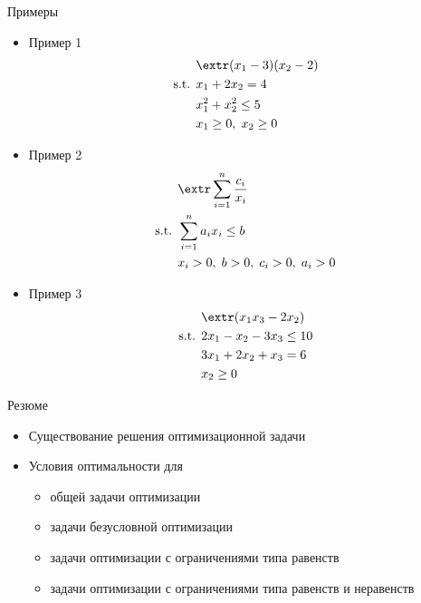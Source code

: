 \documentclass[12pt]{beamer}
\begin{document}
\begin{frame}{Примеры}
\begin{itemize}
\small
\item Пример 1
\vspace{-5mm}
\begin{equation*}
\begin{split}
& \extr (x_1 - 3)(x_2 - 2)\\
\text{s.t. } & x_1 + 2x_2 = 4\\
& x^2_1 + x^2_2 \leq 5\\
& x_1 \geq 0, \; x_2 \geq 0 
\end{split}
\end{equation*} 
\vspace{-5mm}
\item Пример 2
\vspace{-5mm}
\begin{equation*}
\begin{split}
& \extr \sum\limits_{i=1}^n \frac{c_i}{x_i}\\
\text{s.t. } & \sum\limits_{i=1}^n a_ix_i \leq b\\
& x_i > 0, \; b > 0, \; c_i > 0, \; a_i > 0
\end{split}
\end{equation*}
\vspace{-4mm}
\item Пример 3
\vspace{-3mm}
\begin{equation*}
\begin{split}
& \extr (x_1x_3 - 2x_2)\\
\text{s.t. } & 2x_1 - x_2 - 3x_3 \leq 10\\
& 3x_1 + 2x_2 + x_3 = 6\\
& x_2 \geq 0
\end{split}
\end{equation*}
\end{itemize}
\end{frame}

\begin{frame}{Резюме}
\begin{itemize}
\item Существование решения оптимизационной задачи 
\item Условия оптимальности для
\begin{itemize}
\item общей задачи оптимизации
\item задачи безусловной оптимизации
\item задачи оптимизации с ограничениями типа равенств
\item задачи оптимизации с ограничениями типа равенств и неравенств
\end{itemize}
\end{itemize}
\end{frame}
\end{document}
